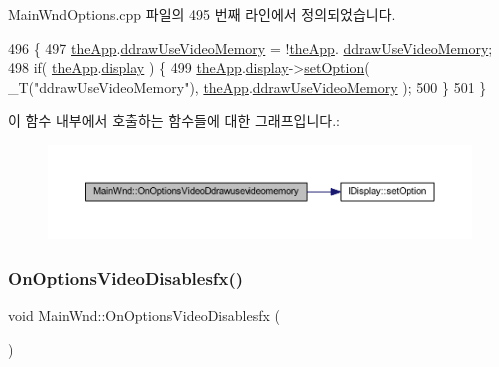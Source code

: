 Main\+Wnd\+Options.\+cpp 파일의 495 번째 라인에서 정의되었습니다.


\begin{DoxyCode}
496 \{
497     \mbox{\hyperlink{_v_b_a_8cpp_a8095a9d06b37a7efe3723f3218ad8fb3}{theApp}}.\mbox{\hyperlink{class_v_b_a_a875d3208513412753e2e946b8d6e6ce3}{ddrawUseVideoMemory}} = !\mbox{\hyperlink{_v_b_a_8cpp_a8095a9d06b37a7efe3723f3218ad8fb3}{theApp}}.
      \mbox{\hyperlink{class_v_b_a_a875d3208513412753e2e946b8d6e6ce3}{ddrawUseVideoMemory}};
498     \textcolor{keywordflow}{if}( \mbox{\hyperlink{_v_b_a_8cpp_a8095a9d06b37a7efe3723f3218ad8fb3}{theApp}}.\mbox{\hyperlink{class_v_b_a_a940e5bad8b3ed2436888dbcd03bfd563}{display}} ) \{
499         \mbox{\hyperlink{_v_b_a_8cpp_a8095a9d06b37a7efe3723f3218ad8fb3}{theApp}}.\mbox{\hyperlink{class_v_b_a_a940e5bad8b3ed2436888dbcd03bfd563}{display}}->\mbox{\hyperlink{class_i_display_a1766244708c252bb8781892c76c20ba9}{setOption}}( \_T(\textcolor{stringliteral}{"ddrawUseVideoMemory"}), 
      \mbox{\hyperlink{_v_b_a_8cpp_a8095a9d06b37a7efe3723f3218ad8fb3}{theApp}}.\mbox{\hyperlink{class_v_b_a_a875d3208513412753e2e946b8d6e6ce3}{ddrawUseVideoMemory}} );
500     \}
501 \}
\end{DoxyCode}
이 함수 내부에서 호출하는 함수들에 대한 그래프입니다.\+:
\nopagebreak
\begin{figure}[H]
\begin{center}
\leavevmode
\includegraphics[width=350pt]{class_main_wnd_a1ba5ef62512a0cdef95369a411bb3c0d_cgraph}
\end{center}
\end{figure}
\mbox{\label{class_main_wnd_a18272b2ec178d9123804805b82fc3db6}} 
\subsubsection{\texorpdfstring{On\+Options\+Video\+Disablesfx()}{OnOptionsVideoDisablesfx()}}
{\footnotesize\ttfamily void Main\+Wnd\+::\+On\+Options\+Video\+Disablesfx (\begin{DoxyParamCaption}{ }\end{DoxyParamCaption})\hspace{0.3cm}{\ttfamily [protected]}}



